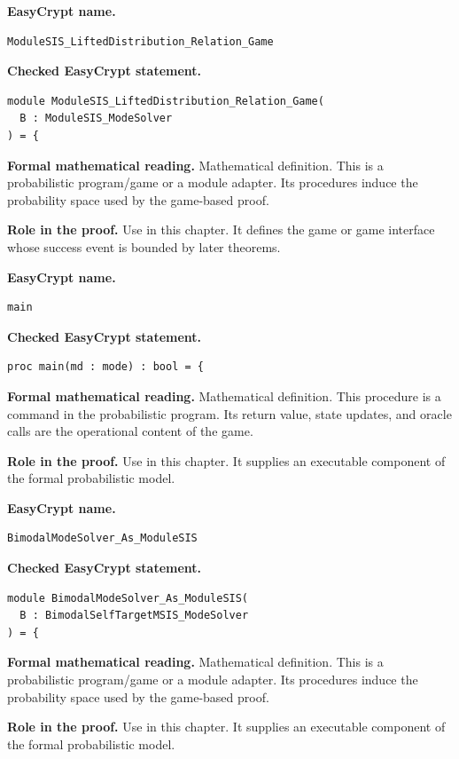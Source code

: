 \begin{formaldefinition}
\noindent\textbf{EasyCrypt name.}
\begin{lstlisting}[language=EasyCrypt,basicstyle=\ttfamily\scriptsize]
ModuleSIS_LiftedDistribution_Relation_Game
\end{lstlisting}
\noindent\textbf{Checked EasyCrypt statement.}
\begin{lstlisting}[language=EasyCrypt,basicstyle=\ttfamily\scriptsize]
module ModuleSIS_LiftedDistribution_Relation_Game(
  B : ModuleSIS_ModeSolver
) = {
\end{lstlisting}
\noindent\textbf{Formal mathematical reading.}
Mathematical definition. This is a probabilistic program/game or a module adapter.  Its procedures induce the probability space used by the game-based proof.

\noindent\textbf{Role in the proof.}
Use in this chapter. It defines the game or game interface whose success event is bounded by later theorems.

\end{formaldefinition}

\begin{formaldefinition}
\noindent\textbf{EasyCrypt name.}
\begin{lstlisting}[language=EasyCrypt,basicstyle=\ttfamily\scriptsize]
main
\end{lstlisting}
\noindent\textbf{Checked EasyCrypt statement.}
\begin{lstlisting}[language=EasyCrypt,basicstyle=\ttfamily\scriptsize]
proc main(md : mode) : bool = {
\end{lstlisting}
\noindent\textbf{Formal mathematical reading.}
Mathematical definition. This procedure is a command in the probabilistic program.  Its return value, state updates, and oracle calls are the operational content of the game.

\noindent\textbf{Role in the proof.}
Use in this chapter. It supplies an executable component of the formal probabilistic model.

\end{formaldefinition}

\begin{formaldefinition}
\noindent\textbf{EasyCrypt name.}
\begin{lstlisting}[language=EasyCrypt,basicstyle=\ttfamily\scriptsize]
BimodalModeSolver_As_ModuleSIS
\end{lstlisting}
\noindent\textbf{Checked EasyCrypt statement.}
\begin{lstlisting}[language=EasyCrypt,basicstyle=\ttfamily\scriptsize]
module BimodalModeSolver_As_ModuleSIS(
  B : BimodalSelfTargetMSIS_ModeSolver
) = {
\end{lstlisting}
\noindent\textbf{Formal mathematical reading.}
Mathematical definition. This is a probabilistic program/game or a module adapter.  Its procedures induce the probability space used by the game-based proof.

\noindent\textbf{Role in the proof.}
Use in this chapter. It supplies an executable component of the formal probabilistic model.

\end{formaldefinition}

